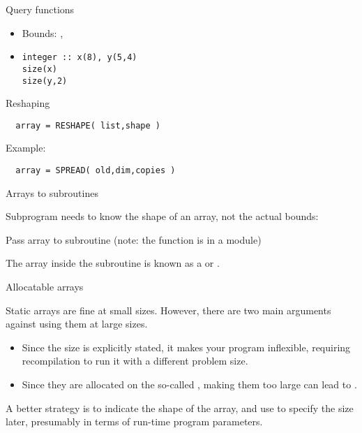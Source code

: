 \begin{slide}{Query functions}
  \label{sl:farray-query}
    \begin{itemize}
    \item Bounds: , 
    \item {}
\begin{verbatim}
integer :: x(8), y(5,4)
size(x)
size(y,2)
\end{verbatim}
    \end{itemize}
\end{slide}

 {Reshaping}

\begin{verbatim}
  array = RESHAPE( list,shape )
\end{verbatim}
Example:

\begin{verbatim}
  array = SPREAD( old,dim,copies )
\end{verbatim}

 {Arrays to subroutines}

Subprogram needs to know the shape of an array, not the actual bounds:

\begin{block}{Pass array to subroutine}
  \label{sl:farray-pass1d}
  (note: the function is in a module)
\end{block}

The array inside the subroutine is known as a
 or
.

 {Allocatable arrays}
\label{sec:allocatable}

Static arrays are fine at small sizes. However, 
there are two main arguments against using them at large sizes.
\begin{itemize}
\item Since the size is explicitly stated, it makes your program
  inflexible, requiring recompilation to run it with a different
  problem size.
\item Since they are allocated on the so-called ,
  making them too large can lead to .
\end{itemize}

A better strategy is to indicate the shape of the array, and use
 to specify
the size later, presumably in terms of run-time program parameters.

